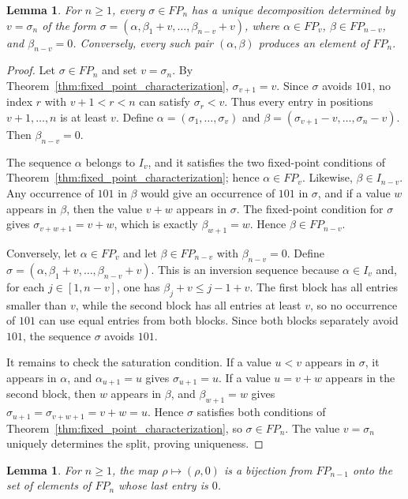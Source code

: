 \documentclass[11pt]{article}
\newtheorem{lem}[thm]{Lemma}
\theoremstyle{remark}
\theoremstyle{definition}
\begin{document}
\begin{lem}\label{lem:fixed_decomposition}
For $n\geq1$, every $\sigma\in FP_n$ has a unique decomposition determined by $v=\sigma_n$ of the form $\sigma=(\alpha,\beta_1+v,\ldots,\beta_{n-v}+v)$, where $\alpha\in FP_v$, $\beta\in FP_{n-v}$, and $\beta_{n-v}=0$. Conversely, every such pair $(\alpha,\beta)$ produces an element of $FP_n$.
\end{lem}

\begin{proof}
Let $\sigma\in FP_n$ and set $v=\sigma_n$. By Theorem~\ref{thm:fixed_point_characterization}, $\sigma_{v+1}=v$. Since $\sigma$ avoids $101$, no index $r$ with $v+1<r<n$ can satisfy $\sigma_r<v$. Thus every entry in positions $v+1,\ldots,n$ is at least $v$. Define $\alpha=(\sigma_1,\ldots,\sigma_v)$ and $\beta=(\sigma_{v+1}-v,\ldots,\sigma_n-v)$. Then $\beta_{n-v}=0$.

The sequence $\alpha$ belongs to $I_v$, and it satisfies the two fixed-point conditions of Theorem~\ref{thm:fixed_point_characterization}; hence $\alpha\in FP_v$. Likewise, $\beta\in I_{n-v}$. Any occurrence of $101$ in $\beta$ would give an occurrence of $101$ in $\sigma$, and if a value $w$ appears in $\beta$, then the value $v+w$ appears in $\sigma$. The fixed-point condition for $\sigma$ gives $\sigma_{v+w+1}=v+w$, which is exactly $\beta_{w+1}=w$. Hence $\beta\in FP_{n-v}$.

Conversely, let $\alpha\in FP_v$ and let $\beta\in FP_{n-v}$ with $\beta_{n-v}=0$. Define $\sigma=(\alpha,\beta_1+v,\ldots,\beta_{n-v}+v)$. This is an inversion sequence because $\alpha\in I_v$ and, for each $j\in[1,n-v]$, one has $\beta_j+v\leq j-1+v$. The first block has all entries smaller than $v$, while the second block has all entries at least $v$, so no occurrence of $101$ can use equal entries from both blocks. Since both blocks separately avoid $101$, the sequence $\sigma$ avoids $101$.

It remains to check the saturation condition. If a value $u<v$ appears in $\sigma$, it appears in $\alpha$, and $\alpha_{u+1}=u$ gives $\sigma_{u+1}=u$. If a value $u=v+w$ appears in the second block, then $w$ appears in $\beta$, and $\beta_{w+1}=w$ gives $\sigma_{u+1}=\sigma_{v+w+1}=v+w=u$. Hence $\sigma$ satisfies both conditions of Theorem~\ref{thm:fixed_point_characterization}, so $\sigma\in FP_n$. The value $v=\sigma_n$ uniquely determines the split, proving uniqueness.
\end{proof}

\begin{lem}\label{lem:fixed_ending_zero}
For $n\geq1$, the map $\rho\mapsto(\rho,0)$ is a bijection from $FP_{n-1}$ onto the set of elements of $FP_n$ whose last entry is $0$.
\end{lem}
\end{document}
